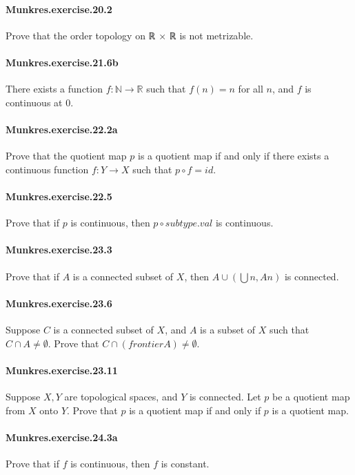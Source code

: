 \documentclass{article}
\begin{document}
{\paragraph{Munkres.exercise.20.2} Prove that the order topology on ℝ × ℝ is not metrizable.

\paragraph{Munkres.exercise.21.6b} There exists a function $f : ℕ → ℝ$ such that $f(n) = n$ for all $n$, and $f$ is continuous at $0$.

\paragraph{Munkres.exercise.22.2a} Prove that the quotient map $p$ is a quotient map if and only if there exists a continuous function $f : Y → X$ such that $p ∘ f = id$.

\paragraph{Munkres.exercise.22.5} Prove that if $p$ is continuous, then $p ∘ subtype.val$ is continuous.

\paragraph{Munkres.exercise.23.3} Prove that if $A$ is a connected subset of $X$, then $A ∪ (⋃ n, A n)$ is connected.

\paragraph{Munkres.exercise.23.6} Suppose $C$ is a connected subset of $X$, and $A$ is a subset of $X$ such that $C ∩ A ≠ ∅$. Prove that $C ∩ (frontier A) ≠ ∅$.

\paragraph{Munkres.exercise.23.11} Suppose $X, Y$ are topological spaces, and $Y$ is connected. Let $p$ be a quotient map from $X$ onto $Y$. Prove that $p$ is a quotient map if and only if $p$ is a quotient map.

\paragraph{Munkres.exercise.24.3a} Prove that if $f$ is continuous, then $f$ is constant.

}
\end{document}
